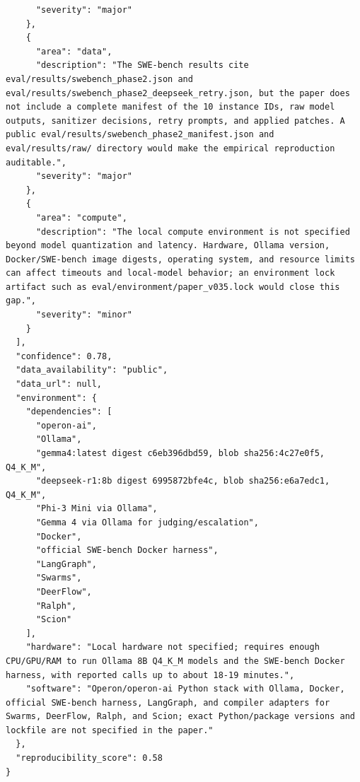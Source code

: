 \documentclass[11pt]{article}
\begin{document}
\begin{verbatim}
      "severity": "major"
    },
    {
      "area": "data",
      "description": "The SWE-bench results cite eval/results/swebench_phase2.json and eval/results/swebench_phase2_deepseek_retry.json, but the paper does not include a complete manifest of the 10 instance IDs, raw model outputs, sanitizer decisions, retry prompts, and applied patches. A public eval/results/swebench_phase2_manifest.json and eval/results/raw/ directory would make the empirical reproduction auditable.",
      "severity": "major"
    },
    {
      "area": "compute",
      "description": "The local compute environment is not specified beyond model quantization and latency. Hardware, Ollama version, Docker/SWE-bench image digests, operating system, and resource limits can affect timeouts and local-model behavior; an environment lock artifact such as eval/environment/paper_v035.lock would close this gap.",
      "severity": "minor"
    }
  ],
  "confidence": 0.78,
  "data_availability": "public",
  "data_url": null,
  "environment": {
    "dependencies": [
      "operon-ai",
      "Ollama",
      "gemma4:latest digest c6eb396dbd59, blob sha256:4c27e0f5, Q4_K_M",
      "deepseek-r1:8b digest 6995872bfe4c, blob sha256:e6a7edc1, Q4_K_M",
      "Phi-3 Mini via Ollama",
      "Gemma 4 via Ollama for judging/escalation",
      "Docker",
      "official SWE-bench Docker harness",
      "LangGraph",
      "Swarms",
      "DeerFlow",
      "Ralph",
      "Scion"
    ],
    "hardware": "Local hardware not specified; requires enough CPU/GPU/RAM to run Ollama 8B Q4_K_M models and the SWE-bench Docker harness, with reported calls up to about 18-19 minutes.",
    "software": "Operon/operon-ai Python stack with Ollama, Docker, official SWE-bench harness, LangGraph, and compiler adapters for Swarms, DeerFlow, Ralph, and Scion; exact Python/package versions and lockfile are not specified in the paper."
  },
  "reproducibility_score": 0.58
}
\end{verbatim}
\end{document}
